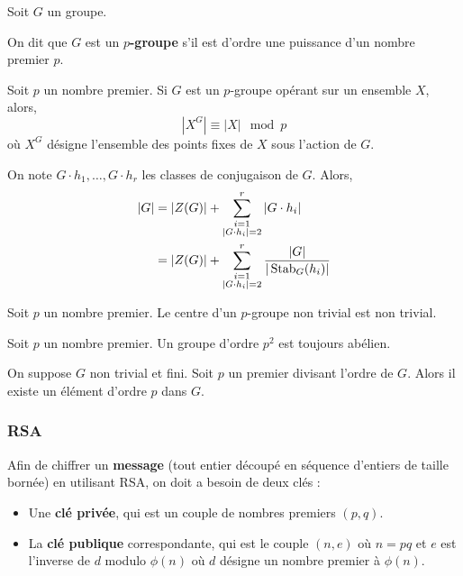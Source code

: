 	Soit $G$ un groupe.

	\begin{definition}
		On dit que $G$ est un \textbf{$p$-groupe} s'il est d'ordre une puissance d'un nombre premier $p$.
	\end{definition}

	\begin{proposition}
		Soit $p$ un nombre premier. Si $G$ est un $p$-groupe opérant sur un ensemble $X$, alors,
		\[ |X^G| \equiv |X| \mod p \]
		où $X^G$ désigne l'ensemble des points fixes de $X$ sous l'action de $G$.
	\end{proposition}

	\begin{corollary}
		On note $G \cdot h_1, \dots, G \cdot h_r$ les classes de conjugaison de $G$. Alors,
		\begin{align*}
			\vert G \vert &= \vert Z(G) \vert + \sum_{\substack{i=1 \\ \vert G \cdot h_i \vert = 2}}^{r} \vert G \cdot h_i \vert \\
			&= \vert Z(G) \vert + \sum_{\substack{i=1 \\ \vert G \cdot h_i \vert = 2}}^{r} \frac{\vert G \vert}{\vert \operatorname{Stab}_G(h_i) \vert}
		\end{align*}
	\end{corollary}

	\begin{corollary}
		Soit $p$ un nombre premier. Le centre d'un $p$-groupe non trivial est non trivial.
	\end{corollary}

	\begin{corollary}
		Soit $p$ un nombre premier. Un groupe d'ordre $p^2$ est toujours abélien.
	\end{corollary}

	\begin{application}
		On suppose $G$ non trivial et fini. Soit $p$ un premier divisant l'ordre de $G$. Alors il existe un élément d'ordre $p$ dans $G$.
	\end{application}

	\subsubsection{RSA}


	\begin{definition}
		Afin de chiffrer un \textbf{message} (tout entier découpé en séquence d'entiers de taille bornée) en utilisant RSA, on doit a besoin de deux clés :
		\begin{itemize}
			\item Une \textbf{clé privée}, qui est un couple de nombres premiers $(p,q)$.
			\item La \textbf{clé publique} correspondante, qui est le couple $(n,e)$ où $n = pq$ et $e$ est l'inverse de $d$ modulo $\phi(n)$ où $d$ désigne un nombre premier à $\phi(n)$.
		\end{itemize}
	\end{definition}

